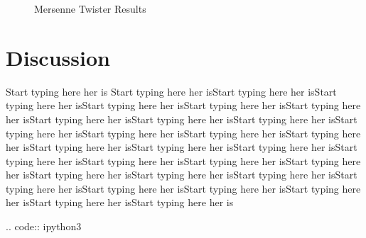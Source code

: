 \documentclass[conference]{IEEEtran}
\begin{document}
\begin{figure}[H]
\centering
{}
\qquad
{}
\caption{Mersenne Twister Results}
\label{fig:MT}
\end{figure}

\section{Discussion}
Start typing here her is Start typing here her isStart typing here her isStart typing here her isStart typing here her isStart typing here her isStart typing here her isStart typing here her isStart typing here her isStart typing here her isStart typing here her isStart typing here her isStart typing here her isStart typing here her isStart typing here her isStart typing here her isStart typing here her isStart typing here her isStart typing here her isStart typing here her isStart typing here her isStart typing here her isStart typing here her isStart typing here her isStart typing here her isStart typing here her isStart typing here her isStart typing here her isStart typing here her isStart typing here her is

.. code:: ipython3

    
\end{document}
